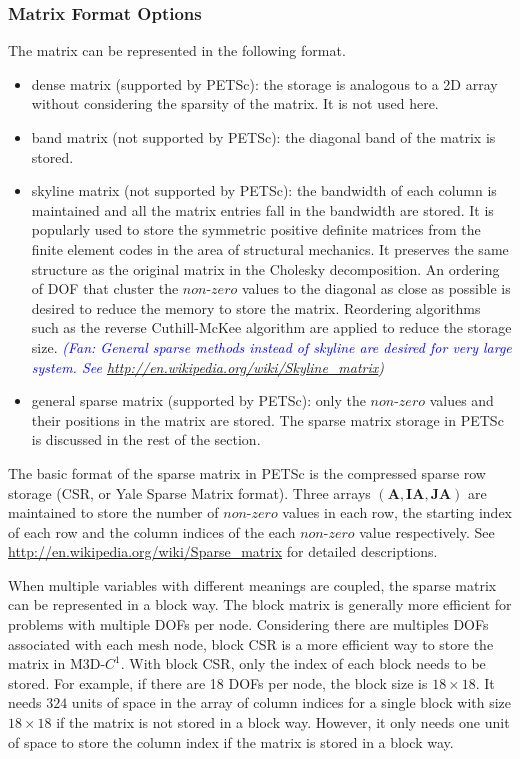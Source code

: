 \documentclass[11pt]{article}  %
\begin{document}
\subsubsection{Matrix Format Options} \label{sec:petscMatStore}
The matrix can be represented in the following format.
\begin{itemize}
\item dense matrix (supported by PETSc):  the storage is analogous to a 2D array without considering the sparsity of the matrix. It is not used here.
\item band matrix (not supported by PETSc): the diagonal band of the matrix is stored. 
\item skyline matrix (not supported by PETSc):  the bandwidth of each column is maintained and all the matrix entries fall in the bandwidth are stored. It \cite{watkins2004fundamentals} is popularly used to store the symmetric positive definite matrices from the finite element codes in the area of structural mechanics. It preserves the same structure as the original matrix  in  the Cholesky decomposition.  An ordering of DOF that cluster the $non$-$zero$ values to the diagonal as close as possible is desired to reduce the memory to store the matrix.   Reordering algorithms such as the reverse Cuthill-McKee algorithm \cite{cuthill1969reducing} are applied to reduce the storage size. 
\textit{\textcolor{blue}{(Fan: General sparse methods instead of skyline are desired for very large system. See \url{http://en.wikipedia.org/wiki/Skyline_matrix}})}
\item general sparse matrix (supported by PETSc): only the $non$-$zero$ values and their positions in the matrix are stored. The sparse matrix storage in PETSc is discussed in the rest of the section.
\end{itemize}

The basic format of the sparse matrix in PETSc \cite{petsc-web-page} is the  compressed sparse row storage (CSR, or Yale Sparse Matrix format).  Three arrays $(\mathbf{A}, \mathbf{IA}, \mathbf{JA})$ are maintained to store the number of $non$-$zero$ values in each row, the starting index of each row and the column indices of the each $non$-$zero$ value respectively.  See \url{http://en.wikipedia.org/wiki/Sparse_matrix}  for detailed descriptions. 

When multiple  variables with different meanings are coupled, the sparse matrix can be  represented in a block way.  The block matrix is generally more efficient for problems with multiple DOFs per node. Considering there are multiples DOFs  associated with each mesh node,  block CSR is a more efficient way to store the matrix in M3D-$C^1$.  With block CSR, only the index of each block needs to be stored. For example, if there are 18 DOFs per node, the block size  is $18\times18$. It needs $324$ units of space in the array of column indices for a single block with size $18\times18$ if the matrix is not stored in a block way. However, it only needs one unit of space to store the column index if the matrix is stored in a block way.  
\end{document}
